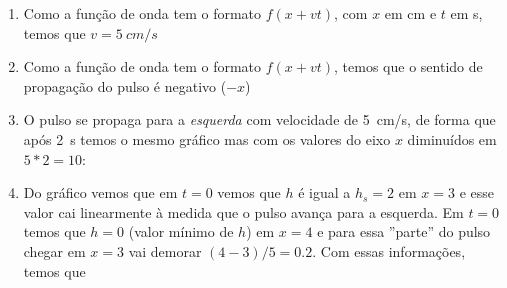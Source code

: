 \documentclass[12pt,a4paper,brazilian, fleqn]{article}
\begin{document}
\begin{enumerate}[label=(\alph*)]
    \item Como a função de onda tem o formato \(f(x+vt)\), com \(x\) em \si{cm}
        e \(t\) em \si{s}, temos que \(v= \SI{5}{cm/s}\)
    \item Como a função de onda tem o formato \(f(x+vt)\), temos que o sentido de
        propagação do pulso é negativo (\(-x\))
    \item O pulso se propaga para a \textit{esquerda} com velocidade de \SI{5}{cm/s}, 
        de forma que após \SI{2}{s} temos o mesmo gráfico mas com os valores do eixo \(x\)
        diminuídos em \(5*2=10\):

        \begin{center}
        \end{center}

    \item Do gráfico vemos que em \(t=0\) vemos que \(h\) é igual a \(h_s=2\) em \(x=3\) e esse valor cai linearmente
        à medida que o pulso avança para a esquerda. Em \(t=0\) temos que \(h=0\) (valor mínimo de \(h\)) em \(x=4\) e para
        essa ''parte'' do pulso chegar em \(x=3\) vai demorar \((4-3)/5=\num{0.2}\). Com essas informações, temos que 

        \begin{center}
        \end{center}
\end{enumerate}
\end{document}
